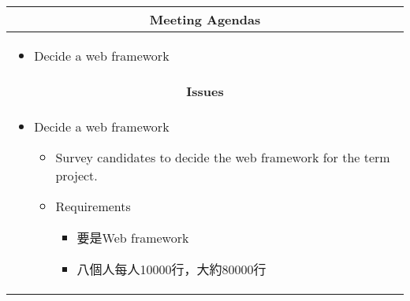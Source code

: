 \documentclass{article}
\begin{document}
\vspace{-1mm}
\begin{tabularx}{\textwidth}{|X|}
\hline
\multicolumn{1}{|c|}{\textbf{Meeting Agendas}} \\
\hline
	\begin{itemize}
		\item Decide a web framework
	\end{itemize} \\
\hline
\multicolumn{1}{|c|}{\textbf{Issues}} \\
	\begin{itemize}
		\item Decide a web framework
		\begin{itemize}
			\item Survey candidates to decide the web framework for the term project.

			\item Requirements
			\begin{itemize}
				\item 要是Web framework
				\item 八個人每人10000行，大約80000行
			\end{itemize}


\end{itemize}
\end{itemize}
\end{tabularx}
\end{document}
